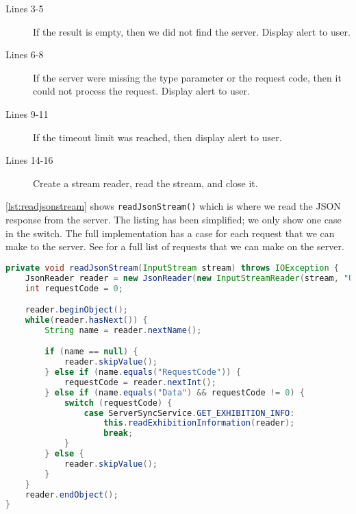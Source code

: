 \begin{description}
\item[Lines 3-5] If the result is empty, then we did not find the server. Display alert to user.
\item[Lines 6-8] If the server were missing the type parameter or the request code, then it could not process the request. Display alert to user.
\item[Lines 9-11] If the timeout limit was reached, then display alert to user. 
\item[Lines 14-16] Create a stream reader, read the stream, and close it.
\end{description}
\autoref{lst:readjsonstream} shows \lstinline|readJsonStream()| which is where we read the JSON response from the server. The listing has been simplified; we only show one case in the switch. The full implementation has a case for each request that we can make to the server. See  for a full list of requests that we can make on the server.

\begin{lstlisting}[language=java, label=lst:readjsonstream, caption={The method \lstinline|readJsonStream()|}]
private void readJsonStream(InputStream stream) throws IOException {
    JsonReader reader = new JsonReader(new InputStreamReader(stream, "UTF-8"));
    int requestCode = 0;

    reader.beginObject();
    while(reader.hasNext()) {
        String name = reader.nextName();

        if (name == null) {
            reader.skipValue();
        } else if (name.equals("RequestCode")) {
            requestCode = reader.nextInt();
        } else if (name.equals("Data") && requestCode != 0) {
            switch (requestCode) {
                case ServerSyncService.GET_EXHIBITION_INFO:
                    this.readExhibitionInformation(reader);
                    break;
            }
        } else {
            reader.skipValue();
        }
    }
    reader.endObject();
}
\end{lstlisting}

